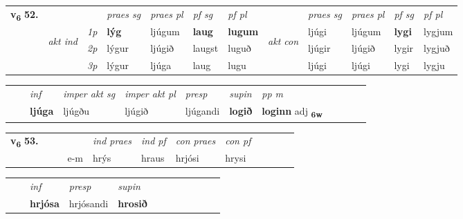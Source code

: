 \begin{tabular}{llllllllllll} \toprule
\multirow{4}{*}{{{\textbf{v{\textsubscript{6}}} \Large{\textbf{52.}}}}}  & &   &  \textit{praes sg}  & \textit{praes pl}  &\textit{ pf sg} & \textit{pf pl} &  &  \textit{praes sg}  & \textit{praes pl}  & \textit{pf sg} & \textit{pf pl } \\*
	\cmidrule{4-7} \cmidrule{9-12}
 & \multirow{3}{*}{\begin{turn}{90}\textit{akt ind}\end{turn}} & {\textit{1p}} & \textbf{lýg} & ljúgum    & \textbf{laug} & \textbf{lugum} & \multirow{3}{*}{\begin{turn}{90}\textit{akt con}\end{turn}} &ljúgi & ljúgum & \textbf{lygi} & lygjum\\*
& &  {\textit{2p}} &  lýgur  & ljúgið   & laugst & luguð & & ljúgir & ljúgið & lygir & lygjuð \\*
& &  {\textit{3p}} & lýgur & ljúga   & laug & lugu & & ljúgi & ljúgi& lygi & lygju  \\*
\cmidrule{4-7} \cmidrule{9-12}
\end{tabular}


\begin{tabular}{llllllllllll}
 & & \textit{inf} & \textit{imper akt sg} & \textit{imper akt pl}   & \textit{presp} & \textit{supin}  & \textit{pp m}     \\*
  & & \textbf{ljúga} & ljúgðu  & ljúgið   & ljúgandi &  \textbf{logið}  & \textbf{loginn} adj \textbf{\textsubscript{6w}} \\*
\cmidrule{1-12}
\end{tabular}





\begin{tabular}{llllllllllll}\toprule
\multirow{4}{*}{{{\textbf{v{\textsubscript{6}}} \Large{\textbf{53.}}}}}  & &  & &  \textit{ind praes} & \textit{ind pf} & \textit{con praes} & \textit{con pf} \\*
&  & & e-m & hrýs & hraus & hrjósi & hrysi \\*
\cmidrule{5-9}
\end{tabular}


\begin{tabular}{llllllllllll}
 & & \textit{inf}     & \textit{presp} & \textit{supin}       \\*
  & & \textbf{hrjósa}      & hrjósandi &  \textbf{hrosið}   \\*
\cmidrule{1-12}
\end{tabular}



